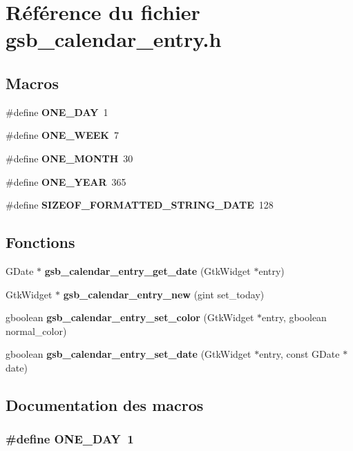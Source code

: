 \section{Référence du fichier gsb\_\-calendar\_\-entry.h}
\label{gsb__calendar__entry_8h}
\subsection*{Macros}
\begin{DoxyCompactItemize}
\item 
\#define {\bf ONE\_\-DAY}~1
\item 
\#define {\bf ONE\_\-WEEK}~7
\item 
\#define {\bf ONE\_\-MONTH}~30
\item 
\#define {\bf ONE\_\-YEAR}~365
\item 
\#define {\bf SIZEOF\_\-FORMATTED\_\-STRING\_\-DATE}~128
\end{DoxyCompactItemize}
\subsection*{Fonctions}
\begin{DoxyCompactItemize}
\item 
GDate $\ast$ {\bf gsb\_\-calendar\_\-entry\_\-get\_\-date} (GtkWidget $\ast$entry)
\item 
GtkWidget $\ast$ {\bf gsb\_\-calendar\_\-entry\_\-new} (gint set\_\-today)
\item 
gboolean {\bf gsb\_\-calendar\_\-entry\_\-set\_\-color} (GtkWidget $\ast$entry, gboolean normal\_\-color)
\item 
gboolean {\bf gsb\_\-calendar\_\-entry\_\-set\_\-date} (GtkWidget $\ast$entry, const GDate $\ast$date)
\end{DoxyCompactItemize}


\subsection{Documentation des macros}
\subsubsection[{ONE\_\-DAY}]{\setlength{\rightskip}{0pt plus 5cm}\#define ONE\_\-DAY~1}\label{gsb__calendar__entry_8h_a44eb26d33eb6c5e235c6cbfa377f60ae}


